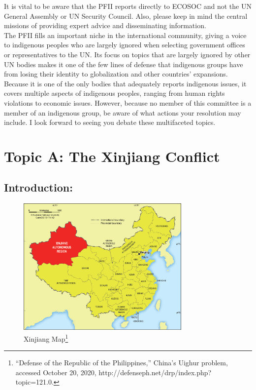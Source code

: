 \documentclass[10pt, letterpaper]{article}
\begin{document}
It is vital to be aware that the PFII reports directly to ECOSOC and not
the UN General Assembly or UN Security Council. Also, please keep in
mind the central missions of providing expert advice and disseminating
information. \\

The PFII fills an important niche in the international community, giving
a voice to indigenous peoples who are largely ignored when selecting
government offices or representatives to the UN. Its focus on topics
that are largely ignored by other UN bodies makes it one of the few
lines of defense that indigenous groups have from losing their identity
to globalization and other countries' expansions. Because it is one of
the only bodies that adequately reports indigenous issues, it covers
multiple aspects of indigenous peoples, ranging from human rights
violations to economic issues. However, because no member of this
committee is a member of an indigenous group, be aware of what actions
your resolution may include. I look forward to seeing you debate these
multifaceted topics. \\

\newpage
\section{{Topic A: The Xinjiang Conflict}}

\subsection{Introduction:}

\begin{figure}
\centering
\includegraphics[width=3.332in,height=2.66667in]{Picture1.png} 
\caption{Xinjiang
Map\footnote{``Defense of the Republic of the Philippines,'' China's
  Uighur problem, accessed October 20, 2020,
  http://defenseph.net/drp/index.php?topic=121.0.}}
\end{figure}
\end{document}
